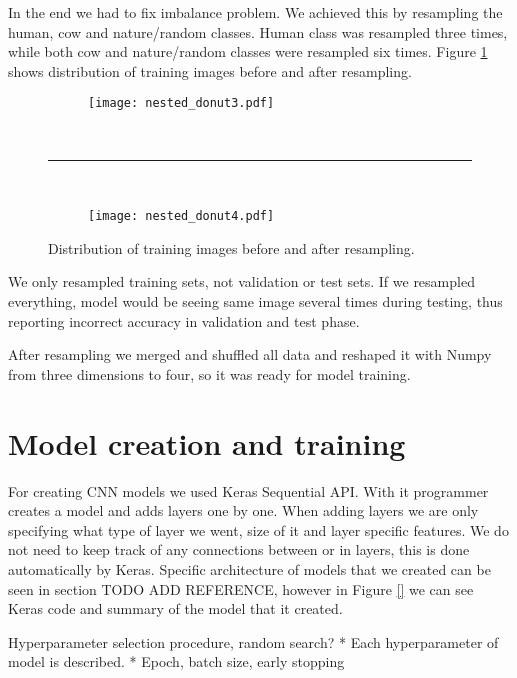 In the end we had to fix imbalance problem.
We achieved this by resampling the human, cow and nature/random classes.
Human class was resampled three times, while both cow and nature/random classes were resampled six times.
Figure \ref{resampled} shows distribution of training images before and after resampling.

\begin{figure}[ht] 
    \begin{subfigure}[b]{1\textwidth}
        \centering
        \texttt{[image: nested\_donut3.pdf]} 
    \end{subfigure}
    \unskip\ \hrule\ 
    \begin{subfigure}[b]{1\textwidth}
        \centering
        \texttt{[image: nested\_donut4.pdf]} 
    \end{subfigure}
    
    \caption{ Distribution of training images before and after resampling.}
    \label{resampled}
\end{figure}

We only resampled training sets, not validation or test sets.
If we resampled everything, model would be seeing same image several times during testing, thus reporting incorrect accuracy in validation and test phase.

After resampling we merged and shuffled all data and reshaped it with Numpy from three dimensions to four, so it was ready for model training.


\section{ Model creation and training}\label{cnn_ref}

For creating CNN models we used Keras Sequential API. 
With it programmer creates a model and adds layers one by one.
When adding layers we are only specifying what type of layer we went, size of it and layer specific features. 
We do not need to keep track of any connections between or in layers, this is done automatically by Keras.
Specific architecture of models that we created can be seen in section TODO ADD REFERENCE, however in Figure \ref{} we can see Keras code and summary of the model that it created.



Hyperparameter selection procedure, random search?
* Each hyperparameter of model is described.
* Epoch, batch size, early stopping


